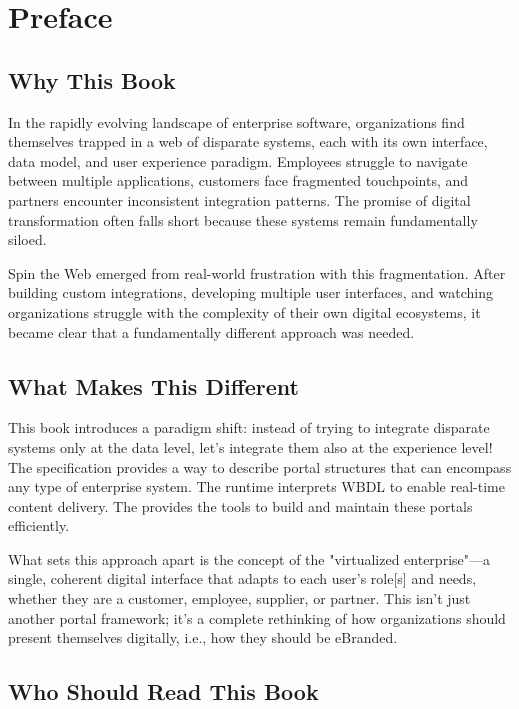 
\chapter*{Preface}

\section*{Why This Book}

In the rapidly evolving landscape of enterprise software, organizations find themselves trapped in a web of disparate systems, each with its own interface, data model, and user experience paradigm. Employees struggle to navigate between multiple applications, customers face fragmented touchpoints, and partners encounter inconsistent integration patterns. The promise of digital transformation often falls short because these systems remain fundamentally siloed.

Spin the Web emerged from real-world frustration with this fragmentation. After building custom integrations, developing multiple user interfaces, and watching organizations struggle with the complexity of their own digital ecosystems, it became clear that a fundamentally different approach was needed.

\section*{What Makes This Different}

This book introduces a paradigm shift: instead of trying to integrate disparate systems only at the data level, let's integrate them also at the experience level! The \wbdl specification provides a way to describe portal structures that can encompass any type of enterprise system. The \webspinner runtime interprets WBDL to enable real-time content delivery. The \studio provides the tools to build and maintain these portals efficiently.

What sets this approach apart is the concept of the "virtualized enterprise"—a single, coherent digital interface that adapts to each user's role[s] and needs, whether they are a customer, employee, supplier, or partner. This isn't just another portal framework; it's a complete rethinking of how organizations should present themselves digitally, i.e., how they should be eBranded.

\section*{Who Should Read This Book}

